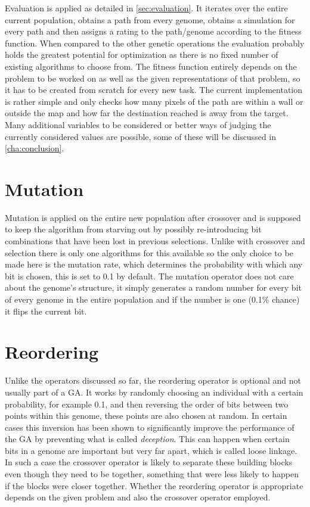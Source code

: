 Evaluation is applied as detailed in \ref{sec:evaluation}. It iterates over the entire current population, obtains a path from every genome, obtains a simulation for every path and then assigns a rating to the path/genome according to the fitness function. 
When compared to the other genetic operations the evaluation probably holds the greatest potential for optimization as there is no fixed number of existing algorithms to choose from. The fitness function entirely depends on the problem to be worked on as well as the given representations of that problem, so it has to be created from scratch for every new task. The current implementation is rather simple and only checks how many pixels of the path are within a wall or outside the map and how far the destination reached is away from the target. Many additional variables to be considered or better ways of judging the currently considered values are possible, some of these will be discussed in \ref{cha:conclusion}.

\section{Mutation} %
\label{sec:mutation}

Mutation is applied on the entire new population after crossover and is supposed to keep the algorithm from starving out by possibly re-introducing bit combinations that have been lost in previous selections. Unlike with crossover and selection there is only one algorithms for this available so the only choice to be made here is the mutation rate, which determines the probability with which any bit is chosen, this is set to 0.1 by default. The mutation operator does not care about the genome's structure, it simply generates a random number for every bit of every genome in the entire population and if the number is one (0.1\% chance) it flips the current bit.

\section{Reordering}
\label{sec:reordering}

Unlike the operators discussed so far, the reordering operator is optional and not usually part of a GA. It works by randomly choosing an individual with a certain probability, for example 0.1, and then reversing the order of bits between two points within this genome, these points are also chosen at random. In certain cases this inversion has been shown to significantly improve the performance of the GA by preventing what is called \textit{deception}\cite{8}. This can happen when certain bits in a genome are important but very far apart, which is called loose linkage. In such a case the crossover operator is likely to separate these building blocks even though they need to be together, something that were less likely to happen if the blocks were closer together. Whether the reordering operator is appropriate depends on the given problem and also the crossover operator employed. \cite{8} %
